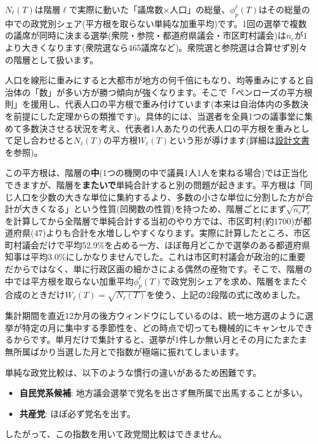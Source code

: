 \documentclass[a4paper,11pt]{ltjsarticle}
\begin{document}
$N_\ell(T)$は階層$\ell$で実際に動いた「議席数×人口」の総量、$\phi_p^\ell(T)$はその総量の中での政党別シェア(平方根を取らない単純な加重平均)です。1回の選挙で複数の議席が同時に決まる選挙(衆院・参院・都道府県議会・市区町村議会)は$n_e$が$1$より大きくなります(衆院選なら465議席など)。衆院選と参院選は合算せず別々の階層として扱います。

人口を線形に重みにすると大都市が地方の何千倍にもなり、均等重みにすると自治体の「数」が多い方が勝つ傾向が強くなります。そこで「ペンローズの平方根則」を援用し、代表人口の平方根で重み付けています(本来は自治体内の多数決を前提にした定理からの類推です)。具体的には、当選者を全員1つの議事堂に集めて多数決させる状況を考え、代表者1人あたりの代表人口の平方根を重みとして足し合わせると$N_\ell(T)$の平方根$W_\ell(T)$という形が導けます(詳細は\href{https://github.com/hiromichikimura-lang/seiryoku-shisu/blob/master/design_document.pdf}{設計文書}を参照)。

この平方根は、階層の\textbf{中}(1つの機関の中で議員1人1人を束ねる場合)では正当化できますが、階層を\textbf{またいで}単純合計すると別の問題が起きます。平方根は「同じ人口を少数の大きな単位に集約するより、多数の小さな単位に分割した方が合計が大きくなる」という性質(凹関数の性質)を持つため、階層ごとにまず$\sqrt{n_eP_e}$を計算してから全階層で単純合計する当初のやり方では、市区町村(約1700)が都道府県(47)よりも合計を水増ししやすくなります。実際に計算したところ、市区町村議会だけで平均52.9\%を占める一方、ほぼ毎月どこかで選挙のある都道府県知事は平均3.0\%にしかなりませんでした。これは市区町村議会が政治的に重要だからではなく、単に行政区画の細かさによる偶然の産物です。そこで、階層の中では平方根を取らない加重平均$\phi_p^\ell(T)$で政党別シェアを求め、階層をまたぐ合成のときだけ$W_\ell(T)=\sqrt{N_\ell(T)}$を使う、上記の2段階の式に改めました。

集計期間を直近12か月の後方ウィンドウにしているのは、統一地方選のように選挙が特定の月に集中する季節性を、どの時点で切っても機械的にキャンセルできるからです。単月だけで集計すると、選挙が1件しか無い月とその月にたまたま無所属ばかり当選した月とで指数が極端に振れてしまいます。

単純な政党比較は、以下のような慣行の違いがあるため困難です。
\begin{itemize}
\item \textbf{自民党系候補}: 地方議会選挙で党名を出さず無所属で出馬することが多い。
\item \textbf{共産党}: ほぼ必ず党名を出す。
\end{itemize}
したがって、この指数を用いて政党間比較はできません。
\end{document}
